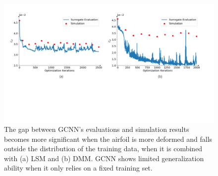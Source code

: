 \begin{figure}[!htb]
    \begin{center}
        \includegraphics[width=0.9\linewidth]{chapter4/fig/lsm_dmm_gcnn_Cd_history.pdf}
    \end{center}
    \caption{
        \small The gap between GCNN's evaluations and simulation results becomes more significant when the airfoil is more deformed and falls outside the distribution of the training data, when it is combined with (a) LSM and (b) DMM. GCNN shows limited generalization ability when it only relies on a fixed training set.
    }
    \label{ch4:fig:gcnn_gap}
\end{figure}